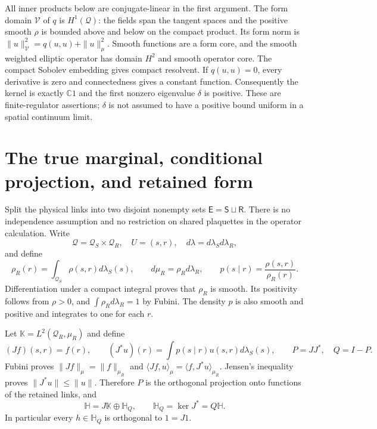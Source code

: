 \documentclass[11pt]{article}
\begin{document}
All inner products below are conjugate-linear in the first argument.
The form domain $\mathcal V$ of $q$ is $H^1(\mathcal Q)$: the fields
span the tangent spaces and the positive smooth $\rho$ is bounded
above and below on the compact product. Its form norm is
$\|u\|_\mathcal V^2=q(u,u)+\|u\|_\mu^2$. Smooth functions are a form
core, and the smooth weighted elliptic operator has domain $H^2$ and
smooth operator core. The compact Sobolev embedding gives compact
resolvent. If $q(u,u)=0$, every derivative is zero and connectedness
gives a constant function. Consequently the kernel is exactly
$\mathbb C1$ and the first nonzero eigenvalue $\delta$ is positive.
These are finite-regulator assertions; $\delta$ is not assumed to have
a positive bound uniform in a spatial continuum limit.

\section{The true marginal, conditional projection, and retained form}

Split the physical links into two disjoint nonempty sets
$\mathsf E=\mathsf S\sqcup\mathsf R$. There is no independence
assumption and no restriction on shared plaquettes in the operator
calculation. Write
\[
 \mathcal Q=\mathcal Q_S\times\mathcal Q_R,\quad U=(s,r),\quad
 d\lambda=d\lambda_Sd\lambda_R,
\]
and define
\begin{equation}\label{eq:marginal}
 \rho_R(r)=\int_{\mathcal Q_S}\rho(s,r)d\lambda_S(s),\qquad
 d\mu_R=\rho_Rd\lambda_R,\qquad
 p(s\mid r)=\frac{\rho(s,r)}{\rho_R(r)}.
\end{equation}
Differentiation under a compact integral proves that $\rho_R$ is smooth.
Its positivity follows from $\rho>0$, and
$\int\rho_Rd\lambda_R=1$ by Fubini. The density $p$ is also smooth
and positive and integrates to one for each $r$.

Let $\mathbb K=L^2(\mathcal Q_R,\mu_R)$ and define
\begin{equation}\label{eq:conditional}
 (Jf)(s,r)=f(r),\qquad
 (J^*u)(r)=\int p(s\mid r)u(s,r)d\lambda_S(s),\qquad
 P=JJ^*,\quad Q=I-P.
\end{equation}
Fubini proves $\|Jf\|_\mu=\|f\|_{\mu_R}$ and
$\langle Jf,u\rangle_\mu=\langle f,J^*u\rangle_{\mu_R}$.
Jensen's inequality proves $\|J^*u\|\leq\|u\|$. Therefore $P$ is
the orthogonal projection onto functions of the retained links, and
\[
 \mathbb H=J\mathbb K\oplus\mathbb H_Q,\qquad
 \mathbb H_Q=\ker J^*=Q\mathbb H.
\]
In particular every $h\in\mathbb H_Q$ is orthogonal to $1=J1$.
\end{document}
